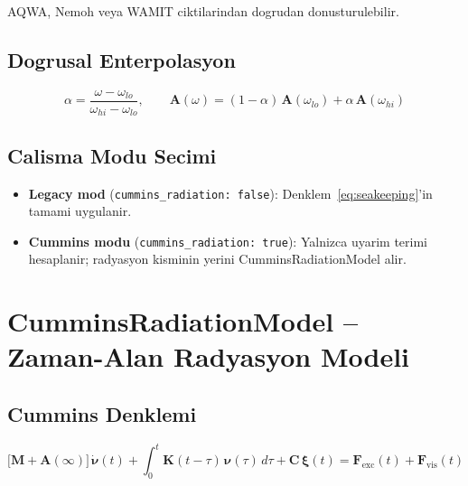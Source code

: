 \documentclass[12pt,a4paper]{article}
\newcommand{\nuvec}{\boldsymbol{\nu}}
\newcommand{\nudot}{\dot{\boldsymbol{\nu}}}
\newcommand{\xivec}{\boldsymbol{\xi}}
\newcommand{\Fvec}{\mathbf{F}}
\newcommand{\Kvec}{\mathbf{K}}
\newcommand{\Cvec}{\mathbf{C}}
\newcommand{\Avec}{\mathbf{A}}
\newcommand{\Ainf}{\mathbf{A}(\infty)}
\begin{document}
AQWA, Nemoh veya WAMIT ciktilarindan dogrudan donusturulebilir.

\subsection{Dogrusal Enterpolasyon}

\begin{equation}
  \alpha = \frac{\omega - \omega_{lo}}{\omega_{hi} - \omega_{lo}},
  \qquad
  \Avec(\omega) = (1-\alpha)\,\Avec(\omega_{lo}) + \alpha\,\Avec(\omega_{hi})
  \label{eq:interp}
\end{equation}

\subsection{Calisma Modu Secimi}

\begin{itemize}
  \item \textbf{Legacy mod} (\texttt{cummins\_radiation: false}): Denklem~\eqref{eq:seakeeping}'in
        tamami uygulanir.
  \item \textbf{Cummins modu} (\texttt{cummins\_radiation: true}): Yalnizca uyarim terimi
        hesaplanir; radyasyon kisminin yerini CumminsRadiationModel alir.
\end{itemize}

\section{CumminsRadiationModel -- Zaman-Alan Radyasyon Modeli}

\subsection{Cummins Denklemi}

\begin{equation}
  \boxed{
  \bigl[\mathbf{M} + \Ainf\bigr]\,\nudot(t)
  + \int_0^t \Kvec(t-\tau)\,\nuvec(\tau)\,d\tau
  + \Cvec\,\xivec(t)
  = \Fvec_{\text{exc}}(t) + \Fvec_{\text{vis}}(t)
  }
  \label{eq:cummins}
\end{equation}
\end{document}

